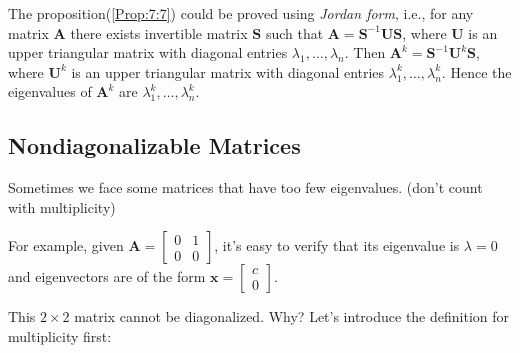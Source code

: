 \begin{remark}
The proposition(\ref{Prop:7:7}) could be proved using \emph{Jordan form}, i.e., for any matrix $\bm A$ there exists invertible matrix $\bm S$ such that $\bm A=\bm S^{-1}\bm U\bm S$, where $\bm U$ is an upper triangular matrix with diagonal entries $\lambda_1,\dots,\lambda_n$. Then $\bm A^k=\bm S^{-1}\bm U^k\bm S$, where $\bm U^k$ is an upper triangular matrix with diagonal entries $\lambda_1^k,\dots,\lambda_n^k$. Hence the eigenvalues of $\bm A^k$ are $\lambda_1^k,\dots,\lambda_n^k$.
\end{remark}

\subsection{Nondiagonalizable Matrices}
Sometimes we face some matrices that have too few eigenvalues. (don't count with multiplicity)

For example, given $\bm A=\begin{bmatrix}
0&1\\0&0
\end{bmatrix}$, it's easy to verify that its eigenvalue is $\lambda=0$ and eigenvectors are of the form $\bm x=\begin{bmatrix}
c\\0
\end{bmatrix}$.

This $2\times 2$ matrix cannot be diagonalized. Why? Let's introduce the definition for multiplicity first:
%

